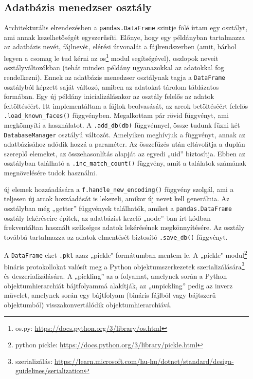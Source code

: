 \subsection{Adatbázis menedzser osztály}
Architekturális elrendezésben a \verb|pandas.DataFrame| szintje fölé írtam egy osztályt, ami annak kezelhetőségét egyszerűsíti. Előnye, hogy egy példányban tartalmazza az adatbázis nevét, fájlnevét, elérési útvonalát a fájlrendszerben (amit, bárhol legyen a csomag le tud kérni az os\footnote{os.py: \url{https://docs.python.org/3/library/os.html}} modul segítségével), oszlopok neveit osztályváltozókban (tehát minden példány ugyanazokkal az adatokkal fog rendelkezni). Ennek az adatbázis menedzser osztálynak tagja a \verb|DataFrame| osztályból képzett saját változó, amiben az adatokat tárolom táblázatos formában. Egy új példány inicializálásakor az osztály felelős az adatok feltöltéséért. Itt implementáltam a fájlok beolvasását, az arcok betöltéséért felelős \verb|.load_known_faces()| függvényben. Megalkottam pár rövid függvényt, ami megkönnyíti a használatot. A \verb|.add_db(db)| függvénnyel, össze tudunk fűzni két \verb|DatabaseManager| osztályú változót. Amelyiken meghívjuk a függvényt, annak az adatbázisához adódik hozzá a paraméter. Az összefűzés után eltávolítja a duplán szereplő elemeket, az összehasonlítás alapját az egyedi „uid” biztosítja.  Ebben az osztályban található a \verb|.inc_match_count()| függvény, amit a találatok számának megnövelésére tudok használni.

új elemek hozzáadására a \verb|f.handle_new_encoding()| függvény szolgál, ami a teljesen új arcok hozzáadását is lekezeli, amikor új nevet kell generálnia. Az osztályban még „getter” függvények találhatók, amiket a \verb|pandas.DataFrame| osztály lekéréseire építek, az adatbázist kezelő „node”-ban írt kódban frekventáltan használt szükséges adatok lekérésének megkönnyítésére. Az osztály továbbá tartalmazza az adatok elmentését biztosító \verb|.save_db()| függvényt.

A \verb|DataFrame|-eket \verb|.pkl| azaz „pickle" formátumban mentem le. A „pickle" modul\footnote{python pickle: \url{https://docs.python.org/3/library/pickle.html}} bináris protokollokat valósít meg a Python objektumszerkezetek szerializálására\footnote{szerializálás: \url{https://learn.microsoft.com/hu-hu/dotnet/standard/design-guidelines/serialization}} és deszerializálására. A „pickling” az a folyamat, amelynek során a Python objektumhierarchiát bájtfolyammá alakítják, az „unpickling” pedig az inverz művelet, amelynek során egy bájtfolyam (bináris fájlból vagy bájtszerű objektumból) visszakonvertálódik objektumhierarchiává.

